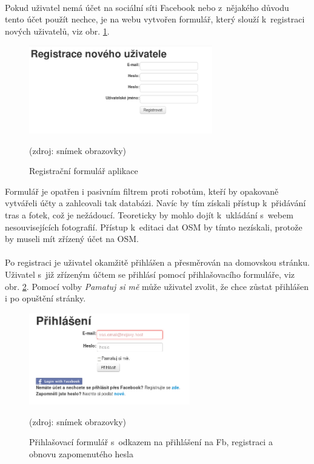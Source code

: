 \documentclass[11pt,a4paper,titlepage,oneside]{book}
\begin{document}
						\paragraph{}Pokud uživatel nemá účet na sociální síti Facebook nebo z~nějakého důvodu tento účet použít nechce, je na webu vytvořen formulář, který slouží k~registraci nových uživatelů, viz obr.  \ref{fig:regForm}.
		\begin{figure}[!h]
			\begin{center}
				\includegraphics[width=8cm]{obrazky/toulavej/regForm.png}
				\caption{Registrační formulář aplikace }
				\label{fig:regForm}
				(zdroj: snímek obrazovky)
			\end{center}
		\end{figure}	
 Formulář je opatřen i pasivním filtrem proti robotům, kteří by opakovaně vytvářeli účty a zahlcovali tak databázi. Navíc by tím získali přístup k~přidávání tras a fotek, což je nežádoucí. Teoreticky by mohlo dojít k~ukládání s~webem nesouvisejících fotografií. Přístup k~editaci dat \ac{OSM} by tímto nezískali, protože by museli mít zřízený účet na \acl{OSM}. 

					\paragraph{}Po registraci je uživatel okamžitě přihlášen a přesměrován na domovskou stránku. Uživatel s~již zřízeným účtem se přihlásí pomocí přihlašovacího formuláře, viz obr. \ref{fig:login}. Pomocí volby \textit{Pamatuj si mě} může uživatel zvolit, že chce zůstat přihlášen i po opuštění stránky.
		\begin{figure}[!h]
			\begin{center}
				\includegraphics[width=7cm]{obrazky/toulavej/login.png}
				\caption[Přihlašovací formulář s~odkazem na přihlášení na Facebook]{Přihlašovací formulář s~odkazem na přihlášení na \ac{Fb}, \newline registraci a obnovu zapomenutého hesla}
				\label{fig:login}
				(zdroj: snímek obrazovky)
			\end{center}
		\end{figure}	
\end{document}
